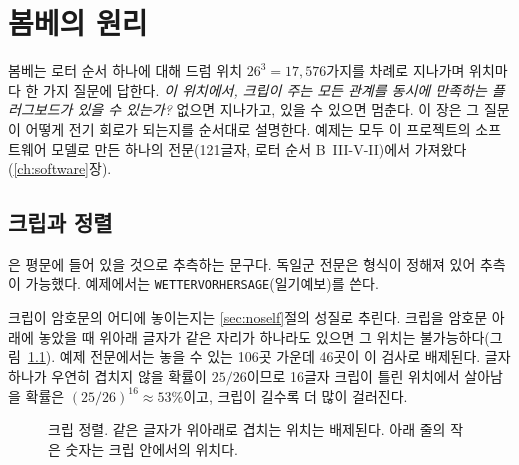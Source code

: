 \chapter{봄베의 원리}\label{ch:bombe}

봄베는 로터 순서 하나에 대해 드럼 위치 $26^3 = 17{,}576$가지를 차례로 지나가며 위치마다 한 가지
질문에 답한다. \emph{이 위치에서, 크립이 주는 모든 관계를 동시에 만족하는 플러그보드가 있을 수 있는가?}
없으면 지나가고, 있을 수 있으면 멈춘다. 이 장은 그 질문이 어떻게 전기 회로가 되는지를 순서대로 설명한다.
예제는 모두 이 프로젝트의 소프트웨어 모델로 만든 하나의 전문(121글자, 로터 순서 B~III-V-II)에서
가져왔다(\ref{ch:software}장).

\section{크립과 정렬}\label{sec:crib}

은 평문에 들어 있을 것으로 추측하는 문구다. 독일군 전문은 형식이 정해져 있어 추측이
가능했다. 예제에서는 \texttt{WETTERVORHERSAGE}(일기예보)를 쓴다.

크립이 암호문의 어디에 놓이는지는 \ref{sec:noself}절의 성질로 추린다. 크립을 암호문 아래에 놓았을 때
위아래 글자가 같은 자리가 하나라도 있으면 그 위치는 불가능하다(그림~\ref{fig:align}). 예제 전문에서는
놓을 수 있는 106곳 가운데 46곳이 이 검사로 배제된다. 글자 하나가 우연히 겹치지 않을 확률이 $25/26$이므로
16글자 크립이 틀린 위치에서 살아남을 확률은 $(25/26)^{16} \approx 53\%$이고, 크립이 길수록 더 많이 걸러진다.

\begin{figure}[ht]
\centering
{}
\caption{크립 정렬. 같은 글자가 위아래로 겹치는 위치는 배제된다. 아래 줄의 작은 숫자는 크립 안에서의 위치다.}
\label{fig:align}
\end{figure}

